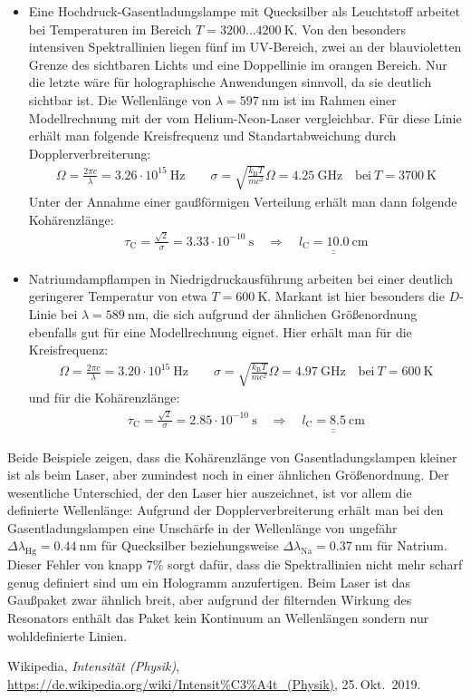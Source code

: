 \documentclass[german,  %
parskip=full,  %
]{scrartcl}
\begin{document}
\begin{itemize}
\item Eine Hochdruck-Gasentladungslampe mit Quecksilber als Leuchtstoff arbeitet bei Temperaturen im Bereich \(T = 3200 \hdots 4200 \ \mathrm{K}\). Von den besonders intensiven Spektrallinien liegen fünf im UV-Bereich, zwei an der blauvioletten Grenze des sichtbaren Lichts und eine Doppellinie im orangen Bereich. Nur die letzte wäre für holographische Anwendungen sinnvoll, da sie deutlich sichtbar ist. Die Wellenlänge von \(\lambda = 597 \ \mathrm{nm}\) ist im Rahmen einer Modellrechnung mit der vom Helium-Neon-Laser vergleichbar. Für diese Linie erhält man folgende Kreisfrequenz und Standartabweichung durch Dopplerverbreiterung:
\begin{align*}
\Omega = \frac{2\pi c}{\lambda} = 3.26\cdot 10^{15} \ \mathrm{Hz} \quad\quad \sigma = \sqrt{\frac{k_{\mathrm{B}} T}{mc^2}} \Omega = 4.25 \ \mathrm{GHz} \quad\text{bei} \ T = 3700 \ \mathrm{K}
\end{align*}
Unter der Annahme einer gaußförmigen Verteilung erhält man dann folgende Kohärenzlänge:
\begin{align*}
\tau_{\mathrm{C}} = \frac{\sqrt{2}}{\sigma} = 3.33\cdot 10^{-10} \ \mathrm{s} \quad\Longrightarrow\quad\underline{\underline{l_{\mathrm{C}} = 10.0 \ \mathrm{cm}}}
\end{align*}
\item Natriumdampflampen in Niedrigdruckausführung arbeiten bei einer deutlich geringerer Temperatur von etwa \(T = 600 \ \mathrm{K}\). Markant ist hier besonders die \(D\)-Linie bei \(\lambda = 589 \ \mathrm{nm}\), die sich aufgrund der ähnlichen Größenordnung ebenfalls gut für eine Modellrechnung eignet. Hier erhält man für die Kreisfrequenz:
\begin{align*}
\Omega = \frac{2\pi c}{\lambda} = 3.20\cdot 10^{15} \ \mathrm{Hz} \quad\quad \sigma = \sqrt{\frac{k_{\mathrm{B}} T}{mc^2}} \Omega = 4.97 \ \mathrm{GHz} \quad\text{bei} \ T = 600 \ \mathrm{K}
\end{align*}
und für die Kohärenzlänge:
\begin{align*}
\tau_{\mathrm{C}} = \frac{\sqrt{2}}{\sigma} = 2.85\cdot 10^{-10} \ \mathrm{s} \quad\Longrightarrow\quad\underline{\underline{l_{\mathrm{C}} = 8.5 \ \mathrm{cm}}}
\end{align*}
\end{itemize}
Beide Beispiele zeigen, dass die Kohärenzlänge von Gasentladungslampen kleiner ist als beim Laser, aber zumindest noch in einer ähnlichen Größenordnung. Der wesentliche Unterschied, der den Laser hier auszeichnet, ist vor allem die definierte Wellenlänge: Aufgrund der Dopplerverbreiterung erhält man bei den Gasentladungslampen eine Unschärfe in der Wellenlänge von ungefähr \(\Delta\lambda_{\mathrm{Hg}} = 0.44 \ \mathrm{nm}\) für Quecksilber beziehungsweise \(\Delta\lambda_{\mathrm{Na}} = 0.37 \ \mathrm{nm}\) für Natrium. Dieser Fehler von knapp \(7 \%\) sorgt dafür, dass die Spektrallinien nicht mehr scharf genug definiert sind um ein Hologramm anzufertigen. Beim Laser ist das Gaußpaket zwar ähnlich breit, aber aufgrund der filternden Wirkung des Resonators enthält das Paket kein Kontinuum an Wellenlängen sondern nur wohldefinierte Linien.
    \begin{thebibliography}{9}
    Wikipedia,
    \emph{Intensität (Physik)},
    \url{https://de.wikipedia.org/wiki/Intensit%C3%A4t_(Physik)},
    25.\,Okt.~2019.
    \end{thebibliography}

\end{document}
